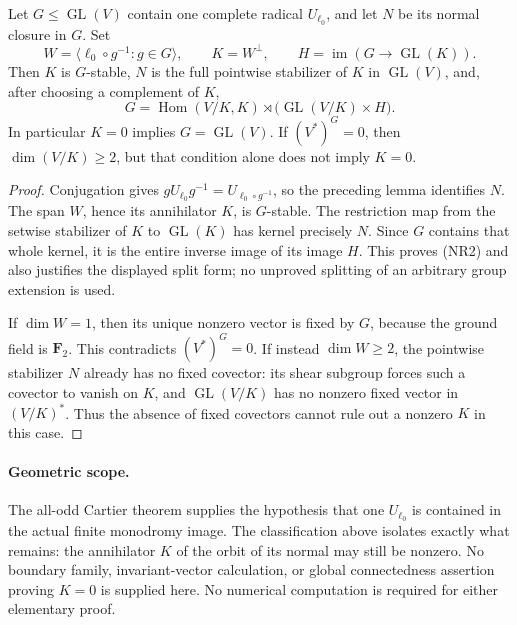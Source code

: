 \begin{proposition}
\label{prop:normal-full-radical-parabolic}
Let \(G\le\operatorname{GL}(V)\) contain one complete radical
\(U_{\ell_0}\), and let \(N\) be its normal closure in \(G\).
Set
\[
 W=\langle\ell_0\circ g^{-1}:g\in G\rangle,\qquad K=W^\perp,
 \qquad H=\operatorname{im}(G\longrightarrow\operatorname{GL}(K)).
\]
Then \(K\) is \(G\)-stable, \(N\) is the full pointwise stabilizer
of \(K\) in \(\operatorname{GL}(V)\), and, after choosing a
complement of \(K\),
\[
       G=\operatorname{Hom}(V/K,K)\rtimes
          \bigl(\operatorname{GL}(V/K)\times H\bigr).             \tag{NR2}
\]
In particular \(K=0\) implies \(G=\operatorname{GL}(V)\).
If \((V^*)^G=0\), then \(\dim(V/K)\ge2\), but that condition
alone does not imply \(K=0\).
\end{proposition}
\begin{proof}
Conjugation gives
\(gU_{\ell_0}g^{-1}=U_{\ell_0\circ g^{-1}}\), so the preceding
lemma identifies \(N\).  The span \(W\), hence its annihilator
\(K\), is \(G\)-stable.  The restriction map from the setwise
stabilizer of \(K\) to \(\operatorname{GL}(K)\) has kernel
precisely \(N\).  Since \(G\) contains that whole kernel, it is
the entire inverse image of its image \(H\).  This proves (NR2)
and also justifies the displayed split form; no unproved
splitting of an arbitrary group extension is used.

If \(\dim W=1\), then its unique nonzero vector is fixed by \(G\),
because the ground field is \(\mathbf F_2\).  This contradicts
\((V^*)^G=0\).  If instead \(\dim W\ge2\), the pointwise
stabilizer \(N\) already has no fixed covector: its shear subgroup
forces such a covector to vanish on \(K\), and
\(\operatorname{GL}(V/K)\) has no nonzero fixed vector in
\((V/K)^*\).  Thus the absence of fixed covectors cannot rule
out a nonzero \(K\) in this case.
\end{proof}

\paragraph{Geometric scope.}
The all-odd Cartier theorem supplies the hypothesis that one
\(U_{\ell_0}\) is contained in the actual finite monodromy image.
The classification above isolates exactly what remains: the
annihilator \(K\) of the orbit of its normal may still be nonzero.
No boundary family, invariant-vector calculation, or global
connectedness assertion proving \(K=0\) is supplied here.
No numerical computation is required for either elementary proof.
